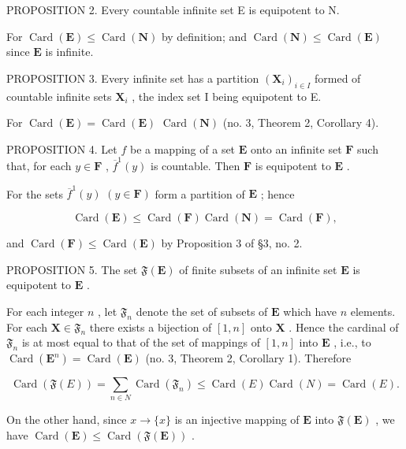 PROPOSITION 2. Every countable infinite set E is equipotent to N.

For \(\operatorname{Card}(\mathbf{E}) \leqslant \operatorname{Card}(\mathbf{N})\) by definition; and \(\operatorname{Card}(\mathbf{N}) \leqslant \operatorname{Card}(\mathbf{E})\) since \(\mathbf{E}\) is infinite.

PROPOSITION 3. Every infinite set has a partition \((\mathbf{X}_i)_{i\in I}\) formed of countable infinite sets \(\mathbf{X}_i\) , the index set I being equipotent to E.

For \(\operatorname{Card}(\mathbf{E}) = \operatorname{Card}(\mathbf{E})\) \(\operatorname{Card}(\mathbf{N})\) (no. 3, Theorem 2, Corollary 4).

PROPOSITION 4. Let \(f\) be a mapping of a set \(\mathbf{E}\) onto an infinite set \(\mathbf{F}\) such that, for each \(y \in \mathbf{F}\) , \(\overline{f}^1(y)\) is countable. Then \(\mathbf{F}\) is equipotent to \(\mathbf{E}\) .

For the sets \(\overline{f}^1 (y)\) \((y\in \mathbf{F})\) form a partition of \(\mathbf{E}\) ; hence

\[
\operatorname{Card} (\mathbf {E}) \leqslant \operatorname{Card} (\mathbf {F}) \operatorname{Card} (\mathbf {N}) = \operatorname{Card} (\mathbf {F}),
\]

and \(\operatorname{Card}(\mathbf{F}) \leqslant \operatorname{Card}(\mathbf{E})\) by Proposition 3 of §3, no. 2.

PROPOSITION 5. The set \(\mathfrak{F}(\mathbf{E})\) of finite subsets of an infinite set \(\mathbf{E}\) is equipotent to \(\mathbf{E}\) .

For each integer \(n\) , let \(\mathfrak{F}_n\) denote the set of subsets of \(\mathbf{E}\) which have \(n\) elements. For each \(\mathbf{X} \in \mathfrak{F}_n\) there exists a bijection of \([1, n]\) onto \(\mathbf{X}\) . Hence the cardinal of \(\mathfrak{F}_n\) is at most equal to that of the set of mappings of \([1, n]\) into \(\mathbf{E}\) , i.e., to \(\operatorname{Card}(\mathbf{E}^n) = \operatorname{Card}(\mathbf{E})\) (no. 3, Theorem 2, Corollary 1). Therefore

\[
\operatorname{Card} (\mathfrak {F} (E)) = \sum_ {n \in N} \operatorname{Card} (\mathfrak {F} _ {n}) \leqslant \operatorname{Card} (E) \operatorname{Card} (N) = \operatorname{Card} (E).
\]

On the other hand, since \(x \to \{x\}\) is an injective mapping of \(\mathbf{E}\) into \(\mathfrak{F}(\mathbf{E})\) , we have \(\operatorname{Card}(\mathbf{E}) \leqslant \operatorname{Card}(\mathfrak{F}(\mathbf{E}))\) .

